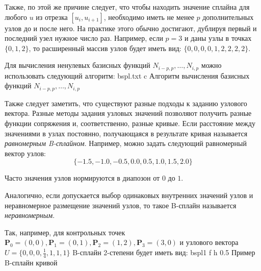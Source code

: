 \documentclass{bmstu}
\begin{document}
Также, по этой же причине следует, что чтобы находить значение сплайна для любого $u$ из отрезка $[u_{i}, u_{i+1}]$, необходимо иметь не менее $p$ дополнительных узлов до и после него. На практике этого обычно достигают, дублируя первый и последний узел нужное число раз. Например, если $p = 3$ и даны узлы в точках $\{ 0 , 1 , 2 \}$, то расширенный массив узлов будет иметь вид: $\{ 0 , 0 , 0 , 0 , 1 , 2 , 2 , 2 , 2\}$.

Для вычисления ненулевых базисных функций $N_{i-p, p},\dots,N_{i,p}$ можно использовать следующий алгоритм:
{bspl.txt} %
{c} %
{Алгоритм вычисления базисных функций $N_{i-p, p},\dots,N_{i,p}$} %


Также следует заметить, что существуют разные подходы к заданию узлового вектора. Разные методы задания узловых значений позволяют получить разные
функции сопряжения и, соответственно, разные кривые. Если расстояние
между значениями в узлах постоянно, получающаяся в результате кривая
называется \textit{равномерным B-сплайном}. Например, можно задать
следующий равномерный вектор узлов:
\[
  \{-1.5, -1.0, -0.5, 0.0, 0.5, 1.0, 1.5, 2.0\}  
\]

Часто значения узлов нормируются в диапозон от $0$ до $1$.

Аналогично, если допускается выбор одинаковых внутренних значений узлов и
неравномерное размещение значений узлов, то такое B-сплайн называется \textit{неравномерным}.

Так, например, для контрольных точек $\mathbf{P}_0 = (0,0), \mathbf{P}_1 = (0,1), \mathbf{P}_2 = (1,2), \mathbf{P}_3 = (3,0)$ и узлового вектора $U=\{0,0,0,\frac{1}4,1,1,1\}$ B-сплайн 2-степени будет иметь вид:
{bspl1} %
{f} %
{h} %
{0.5\textwidth} %
{Пример B-сплайн кривой} %
\end{document}
